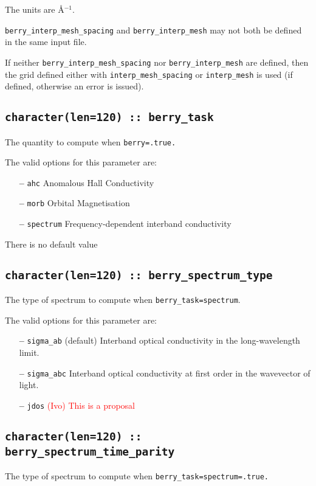 The units are \AA$^{-1}$.

{\tt berry\_interp\_mesh\_spacing} and  {\tt berry\_interp\_mesh} may not both be defined in the same input file.

If neither {\tt berry\_interp\_mesh\_spacing} nor  {\tt berry\_interp\_mesh} are defined, then the grid defined either with {\tt interp\_mesh\_spacing} or {\tt interp\_mesh} is used (if defined, otherwise an error is issued).



\subsection[berry\_task]{\tt character(len=120) ::  berry\_task}
The quantity to compute when {\tt berry=.true.}

The valid options for this parameter are:
\begin{itemize}
\item[{\bf --}]  \verb#ahc# Anomalous Hall Conductivity
\item[{\bf --}]  \verb#morb# Orbital Magnetisation
\item[{\bf --}] \verb#spectrum# Frequency-dependent interband conductivity 
\end{itemize}
There is no default value



\subsection[berry\_spectrum\_type]{\tt character(len=120) ::  berry\_spectrum\_type}
The type of spectrum to compute when {\tt berry\_task=spectrum}. 

The valid options for this parameter are:
\begin{itemize}
\item[{\bf --}]  \verb#sigma_ab# (default) Interband optical conductivity
in the long-wavelength limit.
\item[{\bf --}]  \verb#sigma_abc# Interband optical conductivity
at first order in the wavevector of light.
\item [{\bf --}]  \verb#jdos# \textcolor{red}{(Ivo) This is a proposal}
\end{itemize}

\subsection[berry\_spectrum\_time\_parity]{\tt character(len=120) ::  berry\_spectrum\_time\_parity}
The type of spectrum to compute when {\tt berry\_task=spectrum=.true.} 

